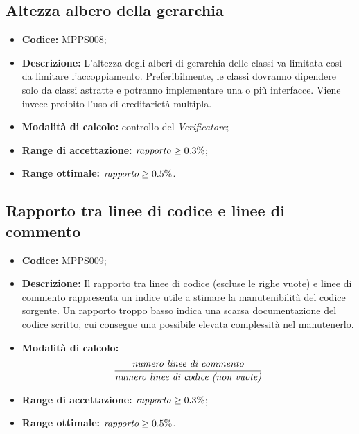 \documentclass[openany,12pt,a4paper]{report}
\begin{document}
\subsection{Altezza albero della gerarchia}

\begin{itemize}

    \item \textbf{Codice:} MPPS008;
    
    \item \textbf{Descrizione:} L'altezza degli alberi di gerarchia delle classi va limitata così da limitare l'accoppiamento. Preferibilmente, le classi dovranno dipendere solo da classi astratte e potranno implementare una o più interfacce. Viene invece proibito l'uso di ereditarietà multipla.

    \item \textbf{Modalità di calcolo:} controllo del \textit{Verificatore};
    
    \item \textbf{Range di accettazione:} $ \textrm{\textit{rapporto}} \geq 0.3\% $;
    
    \item \textbf{Range ottimale:} $ \textrm{\textit{rapporto}} \geq 0.5\% $.
\end{itemize}

\subsection{Rapporto tra linee di codice e linee di commento}

\begin{itemize}

    \item \textbf{Codice:} MPPS009;
    
    \item \textbf{Descrizione:} Il rapporto tra linee di codice (escluse le righe vuote) e linee di commento rappresenta un indice utile a stimare la manutenibilità del codice sorgente. Un rapporto troppo basso indica una scarsa documentazione del codice scritto, cui consegue una possibile elevata complessità nel manutenerlo.

    \item \textbf{Modalità di calcolo:}
    \[\frac{\textrm{\textit{numero linee di commento}}}{\textrm{\textit{numero linee di codice (non vuote)}}} \]
    
    \item \textbf{Range di accettazione:} $ \textrm{\textit{rapporto}} \geq 0.3\% $;
    
    \item \textbf{Range ottimale:} $ \textrm{\textit{rapporto}} \geq 0.5\% $.
\end{itemize}
\end{document}
